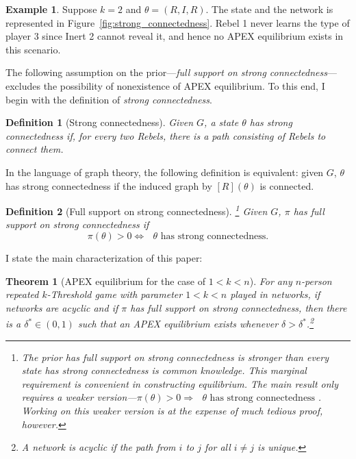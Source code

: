\documentclass[12pt,letter]{article}
\newtheorem{theorem}{Theorem}
\newtheorem{definition}{Definition}[section]
\theoremstyle{definition}
\newtheorem{example}{Example}
\theoremstyle{remark}
\theoremstyle{claim}
\begin{document}
\begin{example}\label{ex_strong_connectedness}
Suppose $k=2$ and $\theta=(R,I,R)$. The state and the network is represented in Figure~\ref{fig:strong_connectedness}. Rebel 1 never learns the type of player 3 since Inert 2 cannot reveal it, and hence no APEX equilibrium exists in this scenario.
\end{example}

The following assumption on the prior---\textit{full support on strong connectedness}---excludes the possibility of nonexistence of APEX equilibrium. To this end, I begin with the definition of \textit{strong connectedness}.

\begin{definition}[Strong connectedness]
\label{def:strong_connectedness}
Given $G$, a state $\theta$ has strong connectedness if, for every two Rebels, there is a path consisting of Rebels to connect them.

\end{definition}  

In the language of graph theory, the following definition is equivalent: given $G$, $\theta$ has strong connectedness if the induced graph by $[R](\theta)$ is connected.

\begin{definition}[Full support on strong connectedness]\footnote{The prior has full support on strong connectedness is stronger than every state has strong connectedness is common knowledge. This marginal requirement is convenient in constructing equilibrium. The main result only requires a weaker version---$\pi(\theta)>0\Rightarrow \text{ $\theta$ has strong connectedness }$. Working on this weaker version is at the expense of much tedious proof, however.}
Given $G$, $\pi$ has full support on strong connectedness if 
\[\pi(\theta)>0\Leftrightarrow \text{ $\theta$ has strong connectedness}.\]
\end{definition}  

I state the main characterization of this paper:
\begin{theorem}[APEX equilibrium for the case of $1<k<n$]
\label{thm_main_result}
For any $n$-person repeated $k$-Threshold game with parameter $1<k<n$ played in networks, if networks are acyclic and if $\pi$ has full support on strong connectedness, then there is a $\delta^{*}\in(0,1)$ such that an APEX equilibrium exists whenever $\delta>\delta^{*}$.\footnote{A network is acyclic if the path from $i$ to $j$ for all $i\neq j$ is unique.}

\end{theorem}
\end{document}
